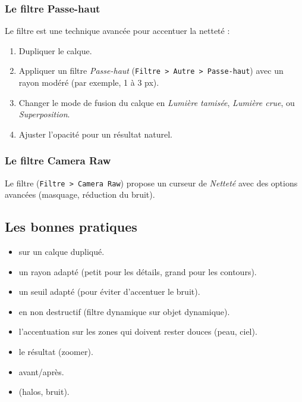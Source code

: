 \subsubsection{Le filtre Passe-haut}

Le filtre  est une technique avancée pour accentuer la netteté :

\begin{enumerate}
    \item Dupliquer le calque.
    \item Appliquer un filtre \emph{Passe-haut} (\texttt{Filtre > Autre > Passe-haut}) avec un rayon modéré (par exemple, 1 à 3 px).
    \item Changer le mode de fusion du calque en \emph{Lumière tamisée}, \emph{Lumière crue}, ou \emph{Superposition}.
    \item Ajuster l'opacité pour un résultat naturel.
\end{enumerate}

\subsubsection{Le filtre Camera Raw}

Le filtre  (\texttt{Filtre > Camera Raw}) propose un curseur de \emph{Netteté} avec des options avancées (masquage, réduction du bruit).

\subsection{Les bonnes pratiques}

\begin{itemize}
    \item {} sur un calque dupliqué.
    \item {} un rayon adapté (petit pour les détails, grand pour les contours).
    \item {} un seuil adapté (pour éviter d'accentuer le bruit).
    \item {} en non destructif (filtre dynamique sur objet dynamique).
    \item {} l'accentuation sur les zones qui doivent rester douces (peau, ciel).
    \item {} le résultat (zoomer).
    \item {} avant/après.
    \item {} (halos, bruit).
\end{itemize}


